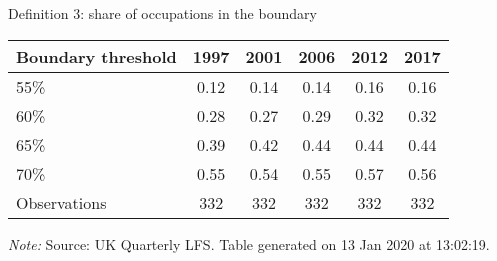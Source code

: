 \begin{center}
\begin{threeparttable}[!h]
\caption{Definition 3: share of occupations in the boundary}
\label{tab:shareBound}
\begin{tabular}{lccccc}
\toprule
\toprule
\textbf{Boundary threshold}&\multicolumn{1}{c}{\textbf{1997}}&\multicolumn{1}{c}{\textbf{2001}}&\multicolumn{1}{c}{\textbf{2006}}&\multicolumn{1}{c}{\textbf{2012}}&\multicolumn{1}{c}{\textbf{2017}} \\
\midrule
55\%        &        0.12&        0.14&        0.14&        0.16&        0.16\\
60\%        &        0.28&        0.27&        0.29&        0.32&        0.32\\
65\%        &        0.39&        0.42&        0.44&        0.44&        0.44\\
70\%        &        0.55&        0.54&        0.55&        0.57&        0.56\\
\midrule Observations&         332&         332&         332&         332&         332\\
\bottomrule
\bottomrule
\end{tabular}
\begin{tablenotes}
\item\footnotesize\textit{Note:} Source: UK Quarterly LFS. Table generated on 13 Jan 2020 at 13:02:19.
\end{tablenotes}
\end{threeparttable}
\end{center}
